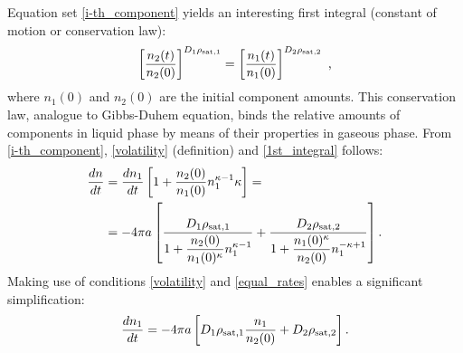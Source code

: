 \documentclass[twoside,twocolumn,9pt]{article}
\begin{document}
Equation set \ref{i-th_component} yields an interesting first integral (constant of motion or conservation law):
\begin{equation}
\left[\frac{n_2(t)}{n_{2}(0)}\right]^{D_1\rho_{{\rm sat},1}}=\left[\frac{n_1(t)}{n_{1}(0)}\right]^{D_2\rho_{{\rm sat},2}} \mbox{~,}
\label{1st_integral}
\end{equation}
where $n_{1}(0)$ and $n_{2}(0)$ are the initial component amounts. This conservation law, analogue to Gibbs-Duhem equation, binds the relative amounts of components in liquid phase by means of their properties in gaseous phase. From \ref{i-th_component}, \ref{volatility} (definition) and \ref{1st_integral} follows:
\begin{align}
\frac{dn}{dt} & = \frac{dn_1}{dt}\left[ 1+\dfrac{n_{2}(0)}{n_{1}(0)}n_1^{\kappa - 1} \kappa \right]= \nonumber\\
& =-4\pi a \left[ \frac{D_1\rho_{{\rm sat},1}}{1+\dfrac{n_{2}(0)}{n_{1}(0)^{\kappa}}n_1^{\kappa - 1}} + \dfrac{D_2\rho_{{\rm sat},2}}{1+\dfrac{n_{1}(0)^{\kappa}}{n_{2}(0)}n_1^{-\kappa +1}} \right] \mbox{.}
\label{n1_a}
\end{align}
Making use of conditions \ref{volatility} and \ref{equal_rates} enables a significant simplification:
\begin{equation}
\frac{dn_1}{dt} = -4\pi a \left[ D_1\rho_{{\rm sat},1}\frac{n_1}{n_{2}(0)} + D_2\rho_{{\rm sat},2} \right] \mbox{.}
\label{simplified}
\end{equation}
\end{document}
